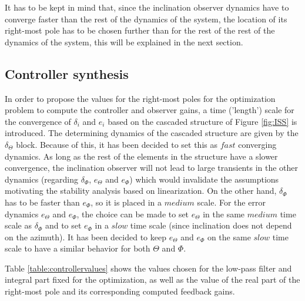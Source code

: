\documentclass[main.tex]{subfiles}
\begin{document}
It has to be kept in mind that, since the inclination observer dynamics have to converge faster than the rest of the dynamics of the system, the location of its right-most pole has to be chosen further than for the rest of the rest of the dynamics of the system, this will be explained in the next section.


\subsection{Controller synthesis}

In order to propose the values for the right-most poles for the optimization problem to compute the controller and observer gains, a time ('length') scale for the convergence of $\delta_i$ and $e_i$ based on the cascaded structure of Figure \ref{fig:ISS} is introduced. The determining dynamics of the cascaded structure are given by the $\delta_\Theta$ block. Because of this, it has been decided to set this as $fast$ converging dynamics. As long as the rest of the elements in the structure have a slower convergence, the inclination observer will not lead to large transients in the other dynamics (regarding $\delta_\Phi$, $e_\Theta$ and $e_\Phi$) which would invalidate the assumptions motivating the stability analysis based on linearization. On the other hand, $\delta_\Phi$ has to be faster than $e_\Phi$, so it is placed in a $medium$ scale. For the error dynamics $e_\Theta$ and $e_\Phi$, the choice can be made to set $e_\Theta$ in the same $medium$ time scale as $\delta_\Phi$ and to set $e_\Phi$ in a $slow$ time scale (since inclination does not depend on the azimuth). It has been decided to keep $e_\Theta$ and $e_\Phi$ on the same $slow$ time scale to have a similar behavior for both $\Theta$ and $\Phi$.

Table \ref{table:controllervalues} shows the values chosen for the low-pass filter and integral part fixed for the optimization, as well as the value of the real part of the right-most pole and its corresponding computed feedback gains.
\end{document}
